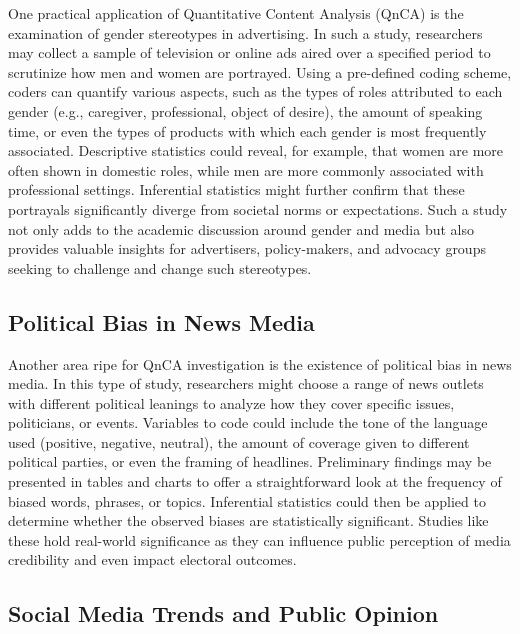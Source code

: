 \documentclass[
  b5paper]{book}
\begin{document}
One practical application of Quantitative Content Analysis (QnCA) is the examination of gender stereotypes in advertising. In such a study, researchers may collect a sample of television or online ads aired over a specified period to scrutinize how men and women are portrayed. Using a pre-defined coding scheme, coders can quantify various aspects, such as the types of roles attributed to each gender (e.g., caregiver, professional, object of desire), the amount of speaking time, or even the types of products with which each gender is most frequently associated. Descriptive statistics could reveal, for example, that women are more often shown in domestic roles, while men are more commonly associated with professional settings. Inferential statistics might further confirm that these portrayals significantly diverge from societal norms or expectations. Such a study not only adds to the academic discussion around gender and media but also provides valuable insights for advertisers, policy-makers, and advocacy groups seeking to challenge and change such stereotypes.

\hypertarget{political-bias-in-news-media}{%
\subsection*{Political Bias in News Media}\label{political-bias-in-news-media}}

Another area ripe for QnCA investigation is the existence of political bias in news media. In this type of study, researchers might choose a range of news outlets with different political leanings to analyze how they cover specific issues, politicians, or events. Variables to code could include the tone of the language used (positive, negative, neutral), the amount of coverage given to different political parties, or even the framing of headlines. Preliminary findings may be presented in tables and charts to offer a straightforward look at the frequency of biased words, phrases, or topics. Inferential statistics could then be applied to determine whether the observed biases are statistically significant. Studies like these hold real-world significance as they can influence public perception of media credibility and even impact electoral outcomes.

\hypertarget{social-media-trends-and-public-opinion}{%
\subsection*{Social Media Trends and Public Opinion}\label{social-media-trends-and-public-opinion}}
\end{document}
